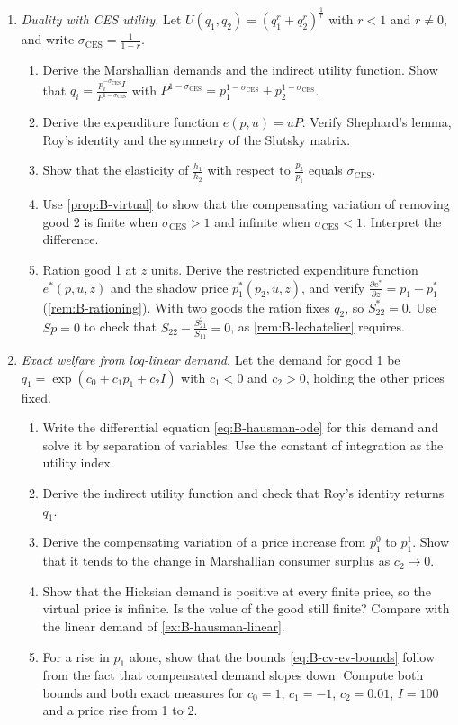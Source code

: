 \begin{enumerate}[label=\arabic*., leftmargin=*, itemsep=6pt]

\item \emph{Duality with CES utility.} Let $U(q_1, q_2) = (q_1^r + q_2^r)^{\frac{1}{r}}$ with $r < 1$ and $r \neq 0$, and
write $\sigma_{\mathrm{CES}} = \frac{1}{1 - r}$.
\begin{enumerate}[label=(\alph*)]
  \item Derive the Marshallian demands and the indirect utility function. Show that
  $q_i = \frac{p_i^{-\sigma_{\mathrm{CES}}}I}{P^{1 - \sigma_{\mathrm{CES}}}}$ with
  $P^{1 - \sigma_{\mathrm{CES}}} = p_1^{1 - \sigma_{\mathrm{CES}}} + p_2^{1 - \sigma_{\mathrm{CES}}}$.
  \item Derive the expenditure function $e(p, u) = uP$. Verify Shephard's lemma, Roy's identity and the symmetry of
  the Slutsky matrix.
  \item Show that the elasticity of $\frac{h_1}{h_2}$ with respect to $\frac{p_2}{p_1}$ equals $\sigma_{\mathrm{CES}}$.
  \item Use \cref{prop:B-virtual} to show that the compensating variation of removing good 2 is finite when
  $\sigma_{\mathrm{CES}} > 1$ and infinite when $\sigma_{\mathrm{CES}} < 1$. Interpret the difference.
  \item Ration good 1 at $z$ units. Derive the restricted expenditure function $e^*(p, u, z)$ and the shadow price
  $p_1^*(p_2, u, z)$, and verify $\frac{\partial e^*}{\partial z} = p_1 - p_1^*$ (\cref{rem:B-rationing}). With two
  goods the ration fixes $q_2$, so $S^*_{22} = 0$. Use $Sp = 0$ to check that $S_{22} - \frac{S_{21}^2}{S_{11}} = 0$,
  as \cref{rem:B-lechatelier} requires.
\end{enumerate}

\item \emph{Exact welfare from log-linear demand.} Let the demand for good 1 be $q_1 = \exp(c_0 + c_1p_1 + c_2I)$ with
$c_1 < 0$ and $c_2 > 0$, holding the other prices fixed.
\begin{enumerate}[label=(\alph*)]
  \item Write the differential equation \eqref{eq:B-hausman-ode} for this demand and solve it by separation of
  variables. Use the constant of integration as the utility index.
  \item Derive the indirect utility function and check that Roy's identity returns $q_1$.
  \item Derive the compensating variation of a price increase from $p_1^0$ to $p_1^1$. Show that it tends to the
  change in Marshallian consumer surplus as $c_2 \to 0$.
  \item Show that the Hicksian demand is positive at every finite price, so the virtual price is infinite. Is the
  value of the good still finite? Compare with the linear demand of \cref{ex:B-hausman-linear}.
  \item For a rise in $p_1$ alone, show that the bounds \eqref{eq:B-cv-ev-bounds} follow from the fact that
  compensated demand slopes down. Compute both bounds and both exact measures for $c_0 = 1$, $c_1 = -1$,
  $c_2 = 0.01$, $I = 100$ and a price rise from 1 to 2.
\end{enumerate}


\end{enumerate}

